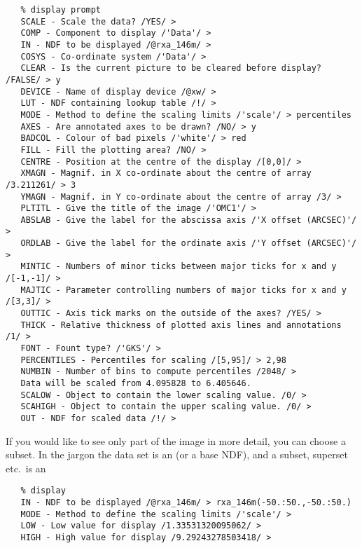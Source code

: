 \begin{verbatim}
   % display prompt
   SCALE - Scale the data? /YES/ > 
   COMP - Component to display /'Data'/ > 
   IN - NDF to be displayed /@rxa_146m/ > 
   COSYS - Co-ordinate system /'Data'/ > 
   CLEAR - Is the current picture to be cleared before display? /FALSE/ > y
   DEVICE - Name of display device /@xw/ > 
   LUT - NDF containing lookup table /!/ > 
   MODE - Method to define the scaling limits /'scale'/ > percentiles
   AXES - Are annotated axes to be drawn? /NO/ > y
   BADCOL - Colour of bad pixels /'white'/ > red
   FILL - Fill the plotting area? /NO/ > 
   CENTRE - Position at the centre of the display /[0,0]/ > 
   XMAGN - Magnif. in X co-ordinate about the centre of array /3.211261/ > 3
   YMAGN - Magnif. in Y co-ordinate about the centre of array /3/ > 
   PLTITL - Give the title of the image /'OMC1'/ > 
   ABSLAB - Give the label for the abscissa axis /'X offset (ARCSEC)'/ > 
   ORDLAB - Give the label for the ordinate axis /'Y offset (ARCSEC)'/ > 
   MINTIC - Numbers of minor ticks between major ticks for x and y /[-1,-1]/ > 
   MAJTIC - Parameter controlling numbers of major ticks for x and y /[3,3]/ > 
   OUTTIC - Axis tick marks on the outside of the axes? /YES/ > 
   THICK - Relative thickness of plotted axis lines and annotations /1/ > 
   FONT - Fount type? /'GKS'/ > 
   PERCENTILES - Percentiles for scaling /[5,95]/ > 2,98
   NUMBIN - Number of bins to compute percentiles /2048/ > 
   Data will be scaled from 4.095828 to 6.405646.
   SCALOW - Object to contain the lower scaling value. /0/ > 
   SCAHIGH - Object to contain the upper scaling value. /0/ > 
   OUT - NDF for scaled data /!/ > 
\end{verbatim}

\begin{latexonly}
\begin{center}
\leavevmode\epsfysize=80mm
\end{center}
\end{latexonly}

   If you would like to see only part of the image in more detail,
   you can choose a subset. In the jargon the data set is an
   (or a base NDF), and a subset, superset etc.\ is an

\begin{verbatim}
   % display
   IN - NDF to be displayed /@rxa_146m/ > rxa_146m(-50.:50.,-50.:50.)
   MODE - Method to define the scaling limits /'scale'/ >
   LOW - Low value for display /1.33531320095062/ > 
   HIGH - High value for display /9.29243278503418/ >
\end{verbatim}

